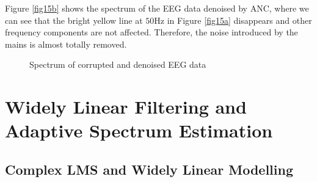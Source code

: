 \documentclass[10pt]{article}
\begin{document}
Figure \ref{fig15b} shows the spectrum of the EEG data denoised by ANC, where we can see that the bright yellow line at $50$Hz 
in Figure \ref{fig15a} disappears and other frequency components are not affected. Therefore, the noise 
introduced by the mains is almost totally removed.


\begin{figure}[H]
    \centering
    \caption{Spectrum of corrupted and denoised EEG data}
    \label{fig15}
\end{figure}

\newpage
\section{Widely Linear Filtering and Adaptive Spectrum Estimation}

\subsection{Complex LMS and Widely Linear Modelling}
\end{document}
